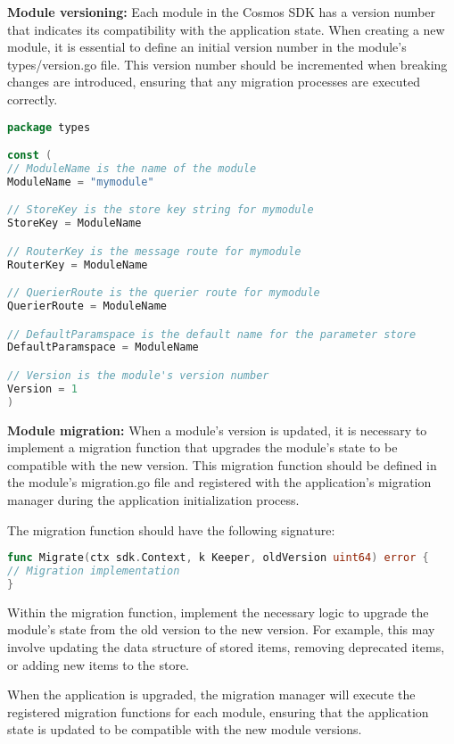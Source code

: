 \documentclass{article}
\begin{document}
\textbf{Module versioning:} Each module in the Cosmos SDK has a version number that indicates its compatibility with the application state. When creating a new module, it is essential to define an initial version number in the module's types/version.go file. This version number should be incremented when breaking changes are introduced, ensuring that any migration processes are executed correctly.

\begin{lstlisting}[language=Go]
package types

const (
// ModuleName is the name of the module
ModuleName = "mymodule"

// StoreKey is the store key string for mymodule
StoreKey = ModuleName

// RouterKey is the message route for mymodule
RouterKey = ModuleName

// QuerierRoute is the querier route for mymodule
QuerierRoute = ModuleName

// DefaultParamspace is the default name for the parameter store
DefaultParamspace = ModuleName

// Version is the module's version number
Version = 1
)
\end{lstlisting}

\textbf{Module migration:} When a module's version is updated, it is necessary to implement a migration function that upgrades the module's state to be compatible with the new version. This migration function should be defined in the module's migration.go file and registered with the application's migration manager during the application initialization process.

The migration function should have the following signature:

\begin{lstlisting}[language=Go]
func Migrate(ctx sdk.Context, k Keeper, oldVersion uint64) error {
// Migration implementation
}
\end{lstlisting}

Within the migration function, implement the necessary logic to upgrade the module's state from the old version to the new version. For example, this may involve updating the data structure of stored items, removing deprecated items, or adding new items to the store.

When the application is upgraded, the migration manager will execute the registered migration functions for each module, ensuring that the application state is updated to be compatible with the new module versions.
\end{document}
